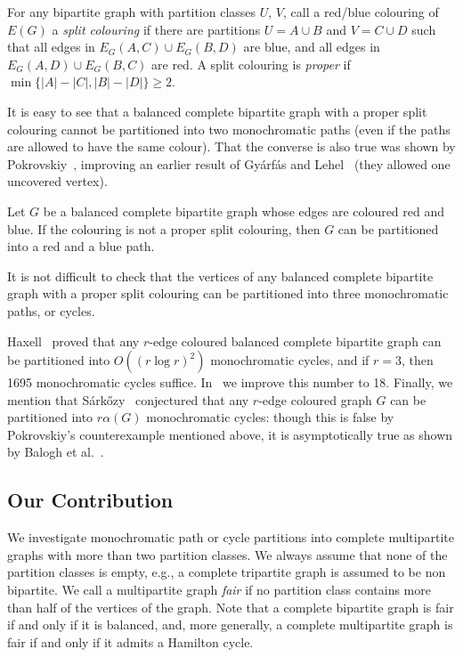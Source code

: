\documentclass[a4paper,10pt]{article}
\begin{document}
For any bipartite graph with partition classes $U$, $V$, call a red/blue colouring of $E(G)$ a \emph{split colouring} if there are partitions $U=A \cup B $ and $V=C \cup D$ such that all edges in $E_G(A,C) \cup E_G(B,D)$ are blue, and all edges in $E_G(A,D) \cup E_G(B,C)$ are red.
A split colouring is \emph{proper} if $\min\{|A|-|C|,|B|-|D|\} \ge 2$.

It is easy to see that a balanced complete bipartite graph with a proper split colouring cannot be partitioned into two monochromatic paths (even if the paths are allowed to have the same colour). That the converse is also true was shown by
Pokrovskiy~\cite{Pok14}, improving an earlier result of Gy\'arf\'as and Lehel~\cite{Gya83, GL73} (they allowed one uncovered vertex).

\begin{theorem}\label{thm:pokrovskiy}
Let $G$ be a balanced complete bipartite graph whose edges are coloured red and blue. If the colouring is not a proper split colouring,
then $G$ can be partitioned into a red and a blue path. 
\end{theorem}

It is not difficult to check that the vertices of any balanced complete bipartite graph with a proper split colouring can be partitioned into three monochromatic paths, or cycles.

 Haxell~\cite{Hax97} proved that any $r$-edge coloured balanced complete bipartite graph can be partitioned into $O((r\log r)^2)$ monochromatic cycles, and if $r=3$, then 1695 monochromatic cycles suffice. In~\cite{LSS14} we improve this number to 18.
Finally, we mention that  S\'ark\H ozy~\cite{Sar11} conjectured that any $r$-edge coloured graph $G$ can be partitioned into $r\alpha (G)$ monochromatic cycles: though this is false by Pokrovskiy's counterexample mentioned above, it is asymptotically true as shown by Balogh et al.~\cite{BBGGS}.

\subsection{Our Contribution}

We investigate monochromatic path or cycle partitions into complete multipartite graphs with more than two partition classes. We always assume that none of the partition classes is empty, {e.g.}, a complete tripartite graph is assumed to be non bipartite.
We call a multipartite graph \emph{fair} if no partition class contains more than half of the vertices of the graph. 
Note that a complete bipartite graph is fair if and only if it is balanced, and, more generally, a complete multipartite graph is fair if and only if it admits a Hamilton cycle.
\end{document}
